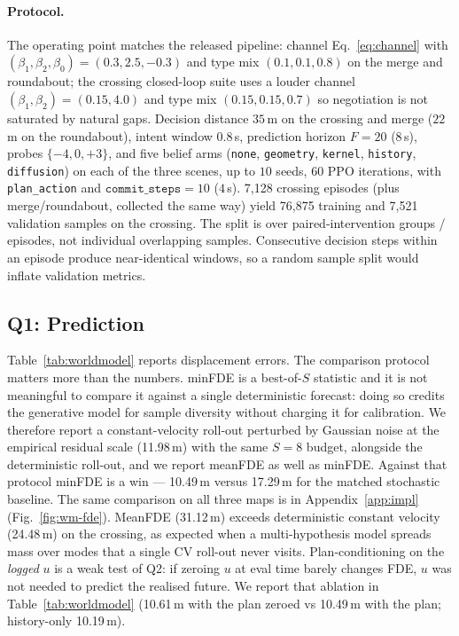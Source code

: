 \documentclass[conference]{IEEEtran}
\newcommand{\numTrainSamples}{76{,}875}
\newcommand{\numValSamples}{7{,}521}
\newcommand{\cvMeanFDE}{24.48}
\newcommand{\cvsMinFDE}{17.29}
\newcommand{\wmMinFDE}{10.49}
\newcommand{\wmMeanFDE}{31.12}
\newcommand{\residStd}{11.98}
\newcommand{\wmZeroMinFDE}{10.61}
\newcommand{\histMinFDE}{10.19}
\newcommand{\numEpisodes}{7{,}128}
\begin{document}
\paragraph{Protocol.} The operating point matches the released pipeline: channel
Eq.~\eqref{eq:channel} with $(\beta_1,\beta_2,\beta_0)=(0.3,2.5,-0.3)$ and
type mix $(0.1,0.1,0.8)$ on the merge and roundabout; the crossing closed-loop
suite uses a louder channel $(\beta_1,\beta_2)=(0.15,4.0)$ and type mix
$(0.15,0.15,0.7)$ so negotiation is not saturated by natural gaps. Decision
distance $35$\,m on the crossing and merge ($22$\,m on the roundabout), intent
window $0.8$\,s, prediction horizon $F{=}20$ ($8$\,s), probes $\{-4,0,+3\}$,
and five belief arms (\texttt{none}, \texttt{geometry}, \texttt{kernel},
\texttt{history}, \texttt{diffusion}) on each of the three scenes, up to $10$
seeds, $60$ PPO iterations, with \texttt{plan\_action} and
$\texttt{commit\_steps}{=}10$ ($4$\,s).
\numEpisodes{} crossing episodes (plus merge/roundabout, collected the same way)
yield \numTrainSamples{} training and \numValSamples{} validation samples on
the crossing. The split is over paired-intervention groups / episodes,
not individual overlapping samples. Consecutive decision steps within an
episode produce near-identical windows, so a random sample split would inflate
validation metrics.

\subsection{Q1: Prediction}
\label{sec:exp:wm}

Table~\ref{tab:worldmodel} reports displacement errors. The comparison protocol
matters more than the numbers. minFDE is a best-of-$S$ statistic and it is not
meaningful to compare it against a single deterministic forecast: doing so
credits the generative model for sample diversity without charging it for
calibration. We therefore report a constant-velocity roll-out perturbed by
Gaussian noise at the empirical residual scale (\residStd{}\,m) with the same
$S=8$ budget, alongside the deterministic roll-out, and we report meanFDE as well
as minFDE. Against that protocol minFDE is a win --- \wmMinFDE{}\,m versus
\cvsMinFDE{}\,m for the matched stochastic baseline. The same comparison on all three maps is in Appendix~\ref{app:impl} (Fig.~\ref{fig:wm-fde}). MeanFDE
(\wmMeanFDE{}\,m) exceeds deterministic constant velocity (\cvMeanFDE{}\,m)
on the crossing, as expected when a multi-hypothesis model spreads mass over
modes that a single CV roll-out never visits.
Plan-conditioning on the \emph{logged} $u$ is a weak test of Q2: if zeroing $u$
at eval time barely changes FDE, $u$ was not needed to predict the realised
future. We report that ablation in Table~\ref{tab:worldmodel}
(\wmZeroMinFDE{}\,m with the plan zeroed vs \wmMinFDE{}\,m with the plan;
history-only \histMinFDE{}\,m).
\end{document}
